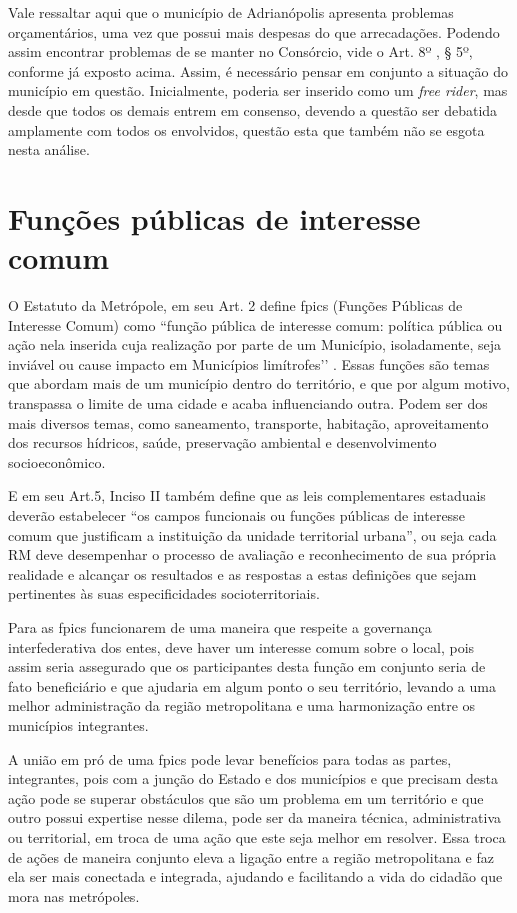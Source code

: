 	Vale ressaltar aqui que o município de Adrianópolis apresenta problemas orçamentários, uma vez que possui mais despesas do que arrecadações. Podendo assim encontrar problemas de se manter no Consórcio, vide o Art. 8º , § 5º, conforme já exposto acima. Assim, é necessário pensar em conjunto a situação do município em questão. Inicialmente, poderia ser inserido como um \textit{free rider}, mas desde que todos os demais entrem em consenso, devendo a questão ser debatida amplamente com todos os envolvidos, questão esta que também não se esgota nesta análise.
	
	\section{Funções públicas de interesse comum}
	
	O Estatuto da Metrópole, em seu Art. 2 define \gls{fpic}s (Funções Públicas de Interesse Comum) como ``função pública de interesse comum: política pública ou ação nela inserida cuja realização por parte de um Município, isoladamente, seja inviável ou cause impacto em Municípios limítrofes’’ \cite{brasil2015a}. Essas funções são temas que abordam mais de um município dentro do território, e que por algum motivo, transpassa o limite de uma cidade e acaba influenciando outra. Podem ser dos mais diversos temas, como saneamento, transporte, habitação, aproveitamento dos recursos hídricos, saúde, preservação ambiental e desenvolvimento socioeconômico.
	
	E em seu Art.5, Inciso II também define que as leis complementares estaduais deverão estabelecer “os campos funcionais ou funções públicas de interesse comum que justificam a instituição da unidade territorial urbana”, ou seja cada RM deve desempenhar o processo de avaliação e reconhecimento de sua própria realidade e alcançar os resultados e as respostas a estas definições que sejam pertinentes às suas especificidades socioterritoriais. \cite{brasil2015a} \cite[p. 108]{marguti2018a}
	
	Para as \gls{fpic}s funcionarem de uma maneira que respeite a governança interfederativa dos entes, deve haver um interesse comum sobre o local, pois assim seria assegurado que os participantes desta função em conjunto seria de fato beneficiário e que ajudaria em algum ponto o seu território, levando a uma melhor administração da região metropolitana e uma harmonização entre os municípios integrantes.
	
	A união em pró de uma \gls{fpic}s pode levar benefícios para todas as partes, integrantes, pois com a junção do Estado e dos municípios e que precisam desta ação pode se superar obstáculos que são um problema em um território e que outro possui expertise nesse dilema, pode ser da maneira técnica, administrativa ou territorial, em troca de uma ação que este seja melhor em resolver. Essa troca de ações de maneira conjunto eleva a ligação entre a região metropolitana e faz ela ser mais conectada e integrada, ajudando e facilitando a vida do cidadão que mora nas metrópoles.
	

